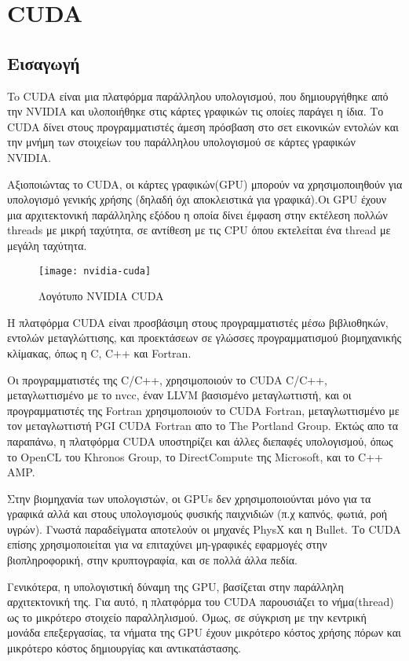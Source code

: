 \section{CUDA}
\subsection{Εισαγωγή}
To CUDA είναι μια πλατφόρμα παράλληλου υπολογισμού, που δημιουργήθηκε από την NVIDIA και υλοποιήθηκε στις κάρτες γραφικών τις οποίες παράγει η ίδια. Το CUDA δίνει στους προγραμματιστές άμεση πρόσβαση στο σετ εικονικών εντολών και την μνήμη των στοιχείων του παράλληλου υπολογισμού σε κάρτες γραφικών NVIDIA. 

Αξιοποιώντας το CUDA, οι κάρτες γραφικών(GPU) μπορούν να χρησιμοποιηθούν για υπολογισμό γενικής χρήσης (δηλαδή όχι αποκλειστικά για γραφικά).Οι GPU έχουν μια αρχιτεκτονική παράλληλης εξόδου η οποία δίνει έμφαση στην εκτέλεση πολλών threads με μικρή ταχύτητα, σε αντίθεση με τις CPU όπου εκτελείται ένα thread με μεγάλη ταχύτητα. 

\begin{figure}[h]
\centering
\texttt{[image: nvidia-cuda]}
\caption{Λογότυπο NVIDIA CUDA}
\end{figure}

Η πλατφόρμα CUDA είναι προσβάσιμη στους προγραμματιστές μέσω βιβλιοθηκών, εντολών μεταγλώττισης, και προεκτάσεων σε γλώσσες προγραμματισμού βιομηχανικής κλίμακας, όπως η C, C++ και Fortran.

Οι προγραμματιστές της C/C++, χρησιμοποιούν το CUDA C/C++, μεταγλωττισμένο με το nvcc, έναν LLVM βασισμένο μεταγλωττιστή, και οι προγραμματιστές της Fortran χρησιμοποιούν το CUDA Fortran, μεταγλωττισμένο με τον μεταγλωττιστή PGI CUDA Fortran απο το The Portland Group. Εκτώς απο τα παραπάνω, η πλατφόρμα CUDA υποστηρίζει και άλλες διεπαφές υπολογισμού, όπως το OpenCL του Khronos Group, το DirectCompute της Microsoft, και το C++ AMP.

Στην βιομηχανία των υπολογιστών, οι GPUs δεν χρησιμοποιούνται μόνο για τα γραφικά αλλά και στους υπολογισμούς φυσικής παιχνιδιών (π.χ καπνός, φωτιά, ροή υγρών). Γνωστά παραδείγματα αποτελούν οι μηχανές PhysX και η Bullet. Το CUDA επίσης χρησιμοποιείται για να επιταχύνει μη-γραφικές εφαρμογές στην βιοπληροφορική, στην κρυπτογραφία, και σε πολλά άλλα πεδία.\cite{cuda-1}

Γενικότερα, η υπολογιστική δύναμη της GPU, βασίζεται στην παράλληλη αρχιτεκτονική της. Για αυτό, η πλατφόρμα του CUDA παρουσιάζει το νήμα(thread) ως το μικρότερο στοιχείο παραλληλισμού. Όμως, σε σύγκριση με την κεντρική μονάδα επεξεργασίας, τα νήματα της GPU έχουν μικρότερο κόστος χρήσης πόρων και μικρότερο κόστος δημιουργίας και αντικατάστασης.

